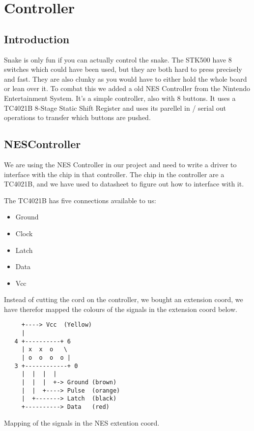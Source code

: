 \section{Controller}

\subsection{Introduction}

Snake is only fun if you can actually control the snake. The STK500 have 8 switches which could have been used, but they are both hard to press precisely and fast. They are also clunky as you would have to either hold the whole board or lean over it. To combat this we added a old NES Controller from the Nintendo Entertainment System. It's a simple controller, also with 8 buttons. It uses a TC4021B 8-Stage Static Shift Register and uses its parellel in / serial out operations to transfer which buttons are pushed.

\subsection{NESController}

We are using the NES Controller in our project and need to write a driver to interface with the chip in that controller.
The chip in the controller are a TC4021B, and we have used to datasheet\cite{toshiba:tc4021b} to figure out how to interface with it.

The TC4021B has five connections available to us:
\begin{itemize}
\item Ground
\item Clock
\item Latch
\item Data
\item Vcc
\end{itemize}

Instead of cutting the cord on the controller, we bought an extension coord, we have therefor mapped the colours of the signals in the extension coord below.

\begin{verbatim}
     +----> Vcc  (Yellow)
     |
   4 +----------+ 6
     | x  x  o   \
     | o  o  o  o |
   3 +------------+ 0
     |  |  |  |
     |  |  |  +-> Ground (brown)
     |  |  +----> Pulse  (orange)
     |  +-------> Latch  (black)
     +----------> Data   (red)
\end{verbatim}
Mapping of the signals in the NES extention coord.

